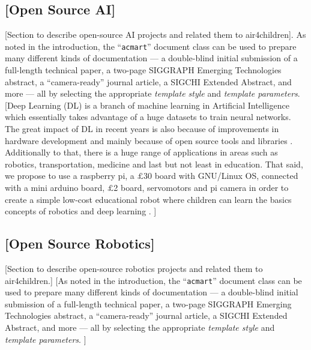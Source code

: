 \documentclass[sigconf]{acmart}
\begin{document}
\subsection{[Open Source AI]}
[Section to describe open-source AI projects and related them to air4children].
As noted in the introduction, the ``\verb|acmart|'' document class can
be used to prepare many different kinds of documentation --- a
double-blind initial submission of a full-length technical paper, a
two-page SIGGRAPH Emerging Technologies abstract, a ``camera-ready''
journal article, a SIGCHI Extended Abstract, and more --- all by
selecting the appropriate {\itshape template style} and {\itshape template parameters}.
[Deep Learning (DL) is a branch of machine learning in Artificial Intelligence
which essentially takes advantage of a huge datasets to train neural networks.
The great impact of DL in recent years is also because of improvements in 
hardware development and mainly because of open source tools and libraries \cite{matelabs2017}.
Additionally to that, there is a huge range of applications in areas such as robotics,
transportation, medicine and last but not least in education.
That said, we propose to use a raspberry pi, a $\pounds$30 board with
GNU/Linux OS, connected with a mini arduino board, $\pounds$2 board,  servomotors 
and pi camera in order to create a simple low-cost educational robot 
where children can learn the basics concepts of robotics and deep learning \cite{durr2015}.
]  




\subsection{[Open Source Robotics]}
[Section to describe open-source robotics projects and related them to air4children.]
[As noted in the introduction, the ``\verb|acmart|'' document class can
be used to prepare many different kinds of documentation --- a
double-blind initial submission of a full-length technical paper, a
two-page SIGGRAPH Emerging Technologies abstract, a ``camera-ready''
journal article, a SIGCHI Extended Abstract, and more --- all by
selecting the appropriate {\itshape template style} and {\itshape
template parameters}.
]
\end{document}
